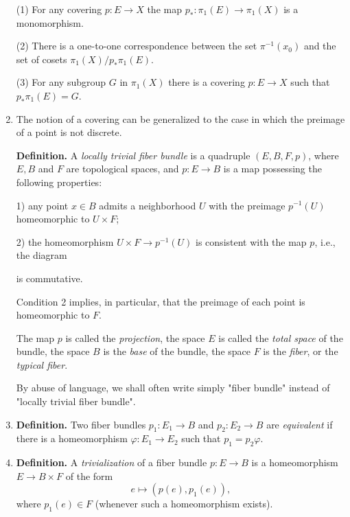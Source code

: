 \documentclass{ctexart}
\begin{document}
\begin{enumerate}
(1) For any covering $p : E \to X$ the map $p_* : \pi_1(E) \to
\pi_1(X)$ is a monomorphism.

(2) There is a one-to-one correspondence between the set
$\pi^{-1}(x_0)$ and the set of cosets $\pi_1(X)/p_*\pi_1(E)$.

(3) For any subgroup $G$ in $\pi_1(X)$ there is a covering $p : E \to
X$ such that $p_*\pi_1(E) = G$.

\item The notion of a covering can be generalized to the case in which
  the preimage of a point is not discrete.

\textbf{Definition.} A \textit{locally trivial fiber bundle} is a
quadruple $(E,B,F,p)$, where $E,B$ and $F$ are topological spaces, and
$p : E \to B$ is a map possessing the following properties:

1) any point $x \in B$ admits a neighborhood $U$ with the preimage
$p^{-1}(U)$ homeomorphic to $U \times F$;

2) the homeomorphism $U \times F \to p^{-1}(U)$ is consistent with the
map $p$, i.e., the diagram


is commutative.

Condition 2 implies, in particular, that the preimage of each point is
homeomorphic to $F$.

The map $p$ is called the \textit{projection}, the space $E$ is called
the \textit{total space} of the bundle, the space $B$ is the \textit{base} of
the bundle, the space $F$ is the \textit{fiber}, or the
\textit{typical fiber}.

By abuse of language, we shall often write simply "fiber bundle"
instead of "locally trivial fiber bundle".

\item \textbf{Definition.} Two fiber bundles $p_1 : E_1 \to B$ and
  $p_2 : E_2 \to B$ are \textit{equivalent} if there is a
  homeomorphism $\varphi : E_1 \to E_2$ such that $p_1 = p_2\varphi$.

\item \textbf{Definition.} A \textit{trivialization} of a fiber bundle
  $p : E \to B$ is a homeomorphism $E \to B \times F$ of the form
\[
e \mapsto (p(e),p_1(e)),
\]
where $p_1(e) \in F$ (whenever such a homeomorphism exists).


\end{enumerate}
\end{document}
